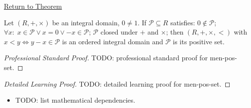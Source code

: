 \newpage
{}
\label{prf:men-pos-set}

\begin{remark*}[Return]
\hyperref[thm:men-pos-set]{Return to Theorem}
\end{remark*}

\begin{theorem*}
Let $(R,+,\times)$ be an integral domain, $0\neq 1$.
If $\mathcal{P}\subseteq R$ satisfies:
$0\notin\mathcal{P}$;
$\forall x:\; x\in\mathcal{P} \vee x=0 \vee {-x}\in\mathcal{P}$;
$\mathcal{P}$ closed under $+$ and $\times$;
then $(R,+,\times,<)$ with $x<y \iff y-x\in\mathcal{P}$ is an
ordered integral domain and $\mathcal{P}$ is its positive set.
\end{theorem*}

\begin{proof}[Professional Standard Proof]
\LRAProofBodyStart
TODO: professional standard proof for men-pos-set.
\end{proof}

\begin{proof}[Detailed Learning Proof]
\LRAProofBodyStart
TODO: detailed learning proof for men-pos-set.
\end{proof}

\begin{remark*}
\end{remark*}

\begin{dependencies}
\begin{itemize}
  \item TODO: list mathematical dependencies.
\end{itemize}
\end{dependencies}

\clearpage
